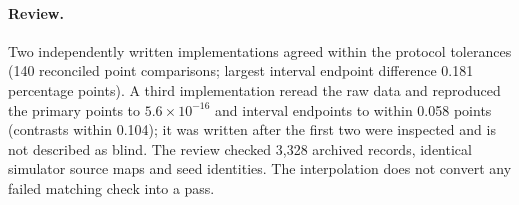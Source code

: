 \paragraph{Review.} Two independently written implementations agreed within the
protocol tolerances (140 reconciled point comparisons; largest interval endpoint
difference 0.181 percentage points). A third implementation reread the raw data
and reproduced the primary points to $5.6\times10^{-16}$ and interval endpoints
to within 0.058 points (contrasts within 0.104); it was written after the first
two were inspected and is not described as blind. The review checked 3,328
archived records, identical simulator source maps and seed identities. The
interpolation does not convert any failed matching check into a pass.

